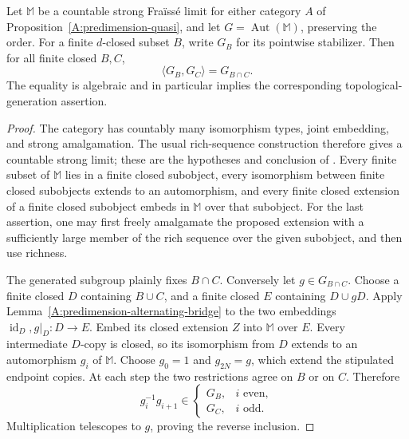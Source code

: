 \begin{proposition}
\label{A:predimension-stabilizers}
Let $\mathbb M$ be a countable strong Fra\"iss\'e limit for either
category $A$ of Proposition~\ref{A:predimension-quasi}, and let
$G=\operatorname{Aut}(\mathbb M)$, preserving the order. For a
finite $d$-closed subset $B$, write $G_B$ for its pointwise
stabilizer. Then for all finite closed $B,C$,
\[
 \langle G_B,G_C\rangle=G_{B\cap C}.
\]
The equality is algebraic and in particular implies the corresponding
topological-generation assertion.
\end{proposition}
\begin{proof}
The category has countably many isomorphism types, joint embedding,
and strong amalgamation. The usual rich-sequence construction
therefore gives a countable strong limit; these are the hypotheses
and conclusion of \citet[Theorem~2.6]{EvansHubickaNesetril2019}.
Every finite subset of $\mathbb M$ lies in a finite closed
subobject, every isomorphism between finite closed subobjects extends
to an automorphism, and every finite closed extension of a finite
closed subobject embeds in $\mathbb M$ over that subobject.
For the last assertion, one may first freely amalgamate the proposed
extension with a sufficiently large member of the rich sequence
over the given subobject, and then use richness.

The generated subgroup plainly fixes $B\cap C$. Conversely let
$g\in G_{B\cap C}$. Choose a finite closed $D$ containing
$B\cup C$, and a finite closed $E$ containing $D\cup gD$.
Apply Lemma~\ref{A:predimension-alternating-bridge} to the two
embeddings $\operatorname{id}_D,g|_D:D\to E$. Embed its closed
extension $Z$ into $\mathbb M$ over $E$. Every intermediate
$D$-copy is closed, so its isomorphism from $D$ extends to an
automorphism $g_i$ of $\mathbb M$. Choose $g_0=1$ and
$g_{2N}=g$, which extend the stipulated endpoint copies. At each
step the two restrictions agree on $B$ or on $C$. Therefore
\[
 g_i^{-1}g_{i+1}\in
 \begin{cases}
 G_B,&i\text{ even},\\
 G_C,&i\text{ odd}.
 \end{cases}
\]
Multiplication telescopes to $g$, proving the reverse inclusion.
\end{proof}

